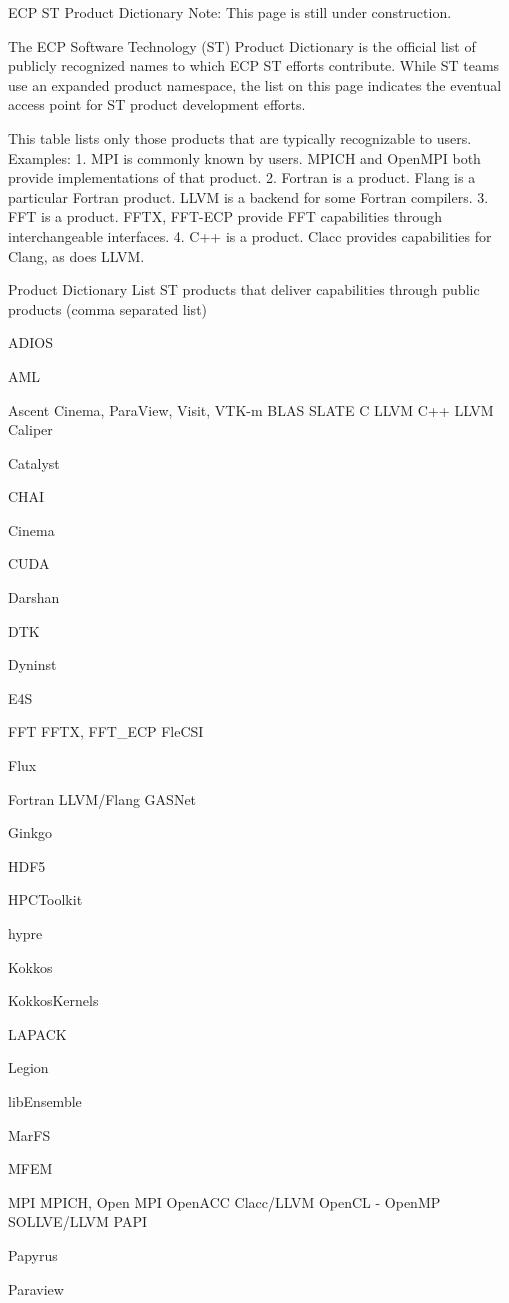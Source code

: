 ECP ST Product Dictionary
Note: This page is still under construction.

The ECP Software Technology (ST) Product Dictionary is the official list of publicly recognized 
names to which ECP ST efforts contribute.  While ST teams use an expanded product 
namespace, the list on this page indicates the eventual access point for ST product development 
efforts.

This table lists only those products that are typically recognizable to users. Examples:
1.	MPI is commonly known by users. MPICH and OpenMPI both provide implementations 
of that product.
2.	Fortran is a product. Flang is a particular Fortran product. LLVM is a backend for some 
Fortran compilers.
3.	FFT is a product. FFTX, FFT-ECP provide FFT capabilities through interchangeable 
interfaces. 
4.	C++ is a product. Clacc provides capabilities for Clang, as does LLVM.

Product 
Dictionary 
List
ST products that deliver capabilities through public products 
(comma separated list)

ADIOS

AML

Ascent
Cinema, ParaView, Visit, VTK-m
BLAS
SLATE
C
LLVM
C++
LLVM
Caliper

Catalyst

CHAI

Cinema

CUDA

Darshan

DTK

Dyninst

E4S

FFT
FFTX, FFT\_ECP
FleCSI

Flux

Fortran
LLVM/Flang
GASNet

Ginkgo

HDF5

HPCToolkit

hypre

Kokkos

KokkosKernels

LAPACK

Legion

libEnsemble

MarFS

MFEM

MPI
MPICH, Open MPI
OpenACC
Clacc/LLVM
OpenCL
-
OpenMP
SOLLVE/LLVM
PAPI

Papyrus

Paraview

